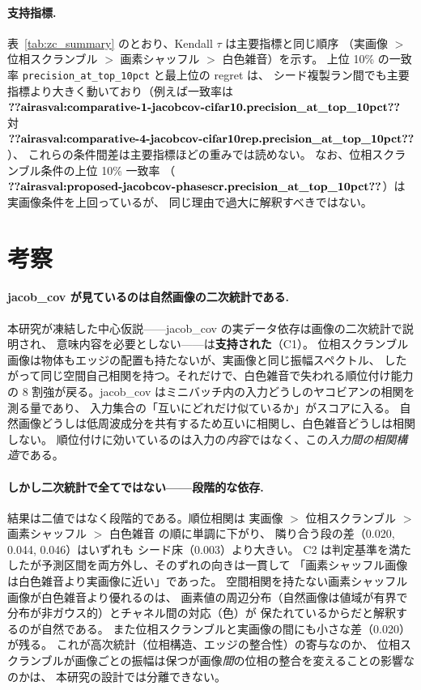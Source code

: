 \documentclass[11pt]{article}
\providecommand{\airasval}[1]{\textbf{??airasval:\detokenize{#1}??}}
\providecommand{\unverified}[1]{#1}
\begin{document}
\paragraph{支持指標.}
表~\ref{tab:zc_summary} のとおり、Kendall $\tau$ は主要指標と同じ順序
（実画像 $>$ 位相スクランブル $>$ 画素シャッフル $>$ 白色雑音）を示す。
上位 10\% の一致率 \texttt{precision\_at\_top\_10pct} と最上位の regret は、
シード複製ラン間でも主要指標より大きく動いており（例えば一致率は
$\airasval{comparative-1-jacobcov-cifar10.precision_at_top_10pct}$ 対
$\airasval{comparative-4-jacobcov-cifar10rep.precision_at_top_10pct}$）、
これらの条件間差は主要指標ほどの重みでは読めない。
なお、位相スクランブル条件の上位 10\% 一致率
（$\airasval{proposed-jacobcov-phasescr.precision_at_top_10pct}$）は実画像条件を上回っているが、
同じ理由で過大に解釈すべきではない。

\section{考察}
\label{sec:discussion}

\paragraph{jacob\_cov が見ているのは自然画像の二次統計である.}
本研究が凍結した中心仮説——jacob\_cov の実データ依存は画像の二次統計で説明され、
意味内容を必要としない——は\textbf{支持された}（C1）。
位相スクランブル画像は物体もエッジの配置も持たないが、実画像と同じ振幅スペクトル、
したがって同じ空間自己相関を持つ。それだけで、白色雑音で失われる順位付け能力の
8 割強が戻る。jacob\_cov はミニバッチ内の入力どうしのヤコビアンの相関を測る量であり、
入力集合の「互いにどれだけ似ているか」がスコアに入る。
自然画像どうしは低周波成分を共有するため互いに相関し、白色雑音どうしは相関しない。
順位付けに効いているのは入力の\emph{内容}ではなく、この\emph{入力間の相関構造}である。

\paragraph{しかし二次統計で全てではない——段階的な依存.}
結果は二値ではなく段階的である。順位相関は
実画像 $>$ 位相スクランブル $>$ 画素シャッフル $>$ 白色雑音 の順に単調に下がり、
隣り合う段の差（\unverified{0.020}, \unverified{0.044}, \unverified{0.046}）はいずれも
シード床（\unverified{0.003}）より大きい。
C2 は判定基準を満たしたが予測区間を両方外し、そのずれの向きは一貫して
「画素シャッフル画像は白色雑音より実画像に近い」であった。
空間相関を持たない画素シャッフル画像が白色雑音より優れるのは、
画素値の周辺分布（自然画像は値域が有界で分布が非ガウス的）とチャネル間の対応（色）が
保たれているからだと解釈するのが自然である。
また位相スクランブルと実画像の間にも小さな差（\unverified{0.020}）が残る。
これが高次統計（位相構造、エッジの整合性）の寄与なのか、
位相スクランブルが画像ごとの振幅は保つが画像\emph{間}の位相の整合を変えることの影響なのかは、
本研究の設計では分離できない。
\end{document}
